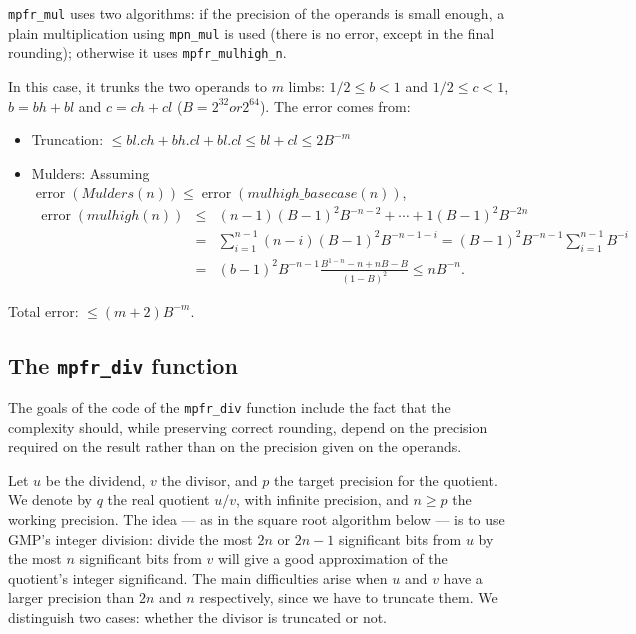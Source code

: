 \documentclass[12pt]{amsart}
\DeclareMathOperator{\error}{error}
\begin{document}
{\tt mpfr\_mul} uses two algorithms: if the precision of the operands
is small enough, a plain multiplication using {\tt mpn\_mul} is used
(there is no error, except in the final rounding);
otherwise it uses {\tt mpfr\_mulhigh\_n}.

In this case, it trunks the two operands to $m$ limbs:
$1/2 \leq b < 1$ and $1/2 \leq c < 1$, $b = bh+bl$ and $c = ch+cl$
($B=2^{32} or 2^{64}$).
The error comes from:
\begin {itemize}
\item Truncation: $ \leq bl.ch + bh.cl + bl.cl \leq bl + cl \leq 2 B^{-m}$
\item Mulders: Assuming $\error(Mulders(n)) \leq \error(mulhigh\_basecase(n))$,
\begin{eqnarray*}
\error(mulhigh(n))
  & \leq & (n-1) (B-1)^2 B^{-n-2} + \cdots + 1 (B-1)^2 B^{-2n} \\
  & = & \sum_{i=1}^{n-1}{(n-i) (B-1)^2 B^{-n-1-i}}
    =   (B-1)^2 B^{-n-1} \sum_{i=1}^{n-1}{B^{-i}} \\
  & = & (b-1)^2 B^{-n-1} \frac{B^{1-n}-n+n B-B}{(1-B)^2} \leq n B^{-n}.
\end{eqnarray*}
\end {itemize}
Total error: $\leq (m+2) B^{-m}$.

\subsection{The {\tt mpfr\_div} function}

The goals of the code of the {\tt mpfr\_div} function include the fact
that the complexity should, while preserving correct
rounding, depend on the precision required on the result rather than
on the precision given on the operands.

Let $u$ be the dividend, $v$ the divisor, and $p$ the target precision
for the quotient. We denote by $q$ the real quotient $u/v$, with infinite
precision, and $n \geq p$ the working precision.
The idea --- as in the square root algorithm below --- is to use GMP's
integer division: divide the most $2n$ or $2n-1$ significant bits from $u$ by
the most $n$ significant bits from $v$ will give a good approximation of
the quotient's integer significand.
The main difficulties arise when $u$ and $v$ have a larger precision than
$2n$ and $n$ respectively, since we have to truncate them.
We distinguish two cases: whether the divisor is truncated or not.
\end{document}

